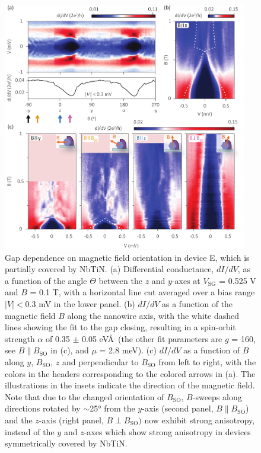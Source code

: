 \begin{figure}[p!]
\centering
\includegraphics[width=0.95\textwidth]{figures/SFig6_Bsweeps_half.pdf}
\caption{\label{fig:BsweepsHalf}
Gap dependence on magnetic field orientation in device E, which is partially covered by NbTiN.
(a) Differential conductance, $dI/dV$, as a function of the angle $\Theta$ between the $z$ and $y$-axes at $V_{\mathrm{SG}}$ = 0.525 V and $B$ = 0.1 T, with a horizontal line cut averaged over a bias range $|V| < 0.3$ mV in the lower panel.
(b) $dI/dV$ as a function of the magnetic field $B$ along the nanowire axis, with the white dashed lines showing the fit to the gap closing, resulting in a spin-orbit strength $\alpha$ of 0.35 $\pm$ 0.05 eV\AA\ (the other fit parameters are $g$ = 160, see $B \parallel B_{\mathrm{SO}}$ in (c), and $\mu$ = 2.8 meV).
(c) $dI/dV$ as a function of $B$ along $y$, $B_{\mathrm{SO}}$, $z$ and perpendicular to $B_{\mathrm{SO}}$ from left to right, with the colors in the headers corresponding to the colored arrows in (a).
The illustrations in the insets indicate the direction of the magnetic field.
Note that due to the changed orientation of $B_{\mathrm{SO}}$, $B$-sweeps along directions rotated by $\sim$\ang{25} from the $y$-axis (second panel, $B \parallel B_{\mathrm{SO}}$) and the $z$-axis (right panel, $B \perp B_{\mathrm{SO}})$  now exhibit strong anisotropy, instead of the $y$ and $z$-axes which show strong anisotropy in devices symmetrically covered by NbTiN.
}
\end{figure}

